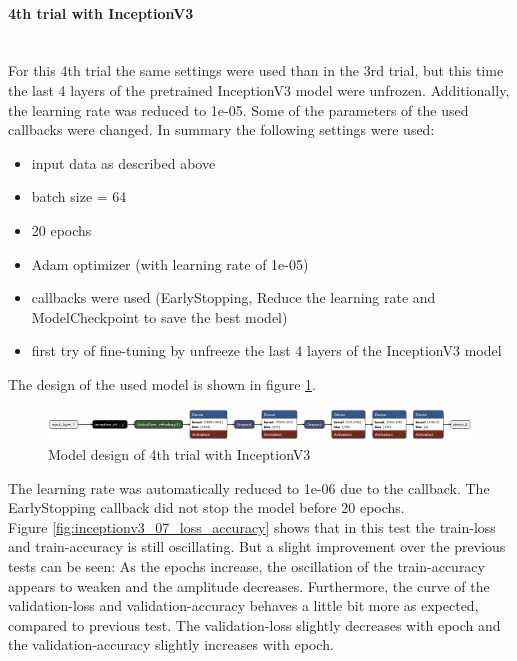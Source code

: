 \documentclass{article}
\begin{document}
\paragraph{4th trial with InceptionV3}\mbox{}\\

For this 4th trial the same settings were used than in the 3rd trial, but this time the last 4 layers of the pretrained InceptionV3 model were unfrozen. Additionally, the learning rate was reduced to 1e-05. Some of the parameters of the used callbacks were changed. In summary the following settings were used: 
\begin{itemize}
\item input data as described above
\item batch size = 64
\item 20 epochs 
\item Adam optimizer (with learning rate of 1e-05)
\item callbacks were used (EarlyStopping, Reduce the learning rate and ModelCheckpoint to save the best model)
\item first try of fine-tuning by unfreeze the last 4 layers of the InceptionV3 model
\end{itemize}

The design of the used model is shown in figure \ref{fig:inceptionv3_07.keras_model_design}.
\begin{figure}%
    \centering
    \includegraphics[width=1.0\linewidth]{inceptionv3_07.keras_model_design_nice.png}
    \caption{Model design of 4th trial with InceptionV3}
    \label{fig:inceptionv3_07.keras_model_design}
\end{figure}

The learning rate was automatically reduced to 1e-06 due to the callback. The EarlyStopping callback did not stop the model before 20 epochs. \\
Figure \ref{fig:inceptionv3_07_loss_accuracy} shows that in this test the train-loss and train-accuracy is still oscillating. But a slight improvement over the previous tests can be seen: As the epochs increase, the oscillation of the train-accuracy appears to weaken and the amplitude decreases. Furthermore, the curve of the validation-loss and validation-accuracy behaves a little bit more as expected, compared to previous test. The validation-loss slightly decreases with epoch and the validation-accuracy slightly increases with epoch. 
\end{document}
